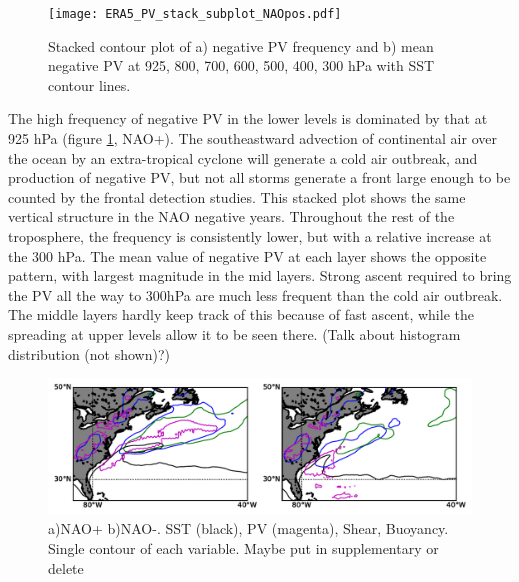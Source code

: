 \begin{figure}[h]
	\centering
	\texttt{[image: ERA5\_PV\_stack\_subplot\_NAOpos.pdf]}
	\caption{Stacked contour plot of a) negative PV frequency and b) mean negative PV at 925, 800, 700, 600, 500, 400, 300 hPa with SST contour lines.}
	\label{fig:ERA5_PV_stack}
\end{figure}


The high frequency of negative PV in the lower levels is dominated by that at 925 hPa (figure \ref{fig:ERA5_PV_stack}, NAO+). The southeastward advection of continental air over the ocean by an extra-tropical cyclone will generate a cold air outbreak, and production of negative PV, but not all storms generate a front large enough to be counted by the frontal detection studies. This stacked plot shows the same vertical structure in the NAO negative years. Throughout the rest of the troposphere, the frequency is consistently lower, but with a relative increase at the 300 hPa. The mean value of negative PV at each layer shows the opposite pattern, with largest magnitude in the mid layers. Strong ascent required to bring the PV all the way to 300hPa are much less frequent than the cold air outbreak. The middle layers hardly keep track of this because of fast ascent, while the spreading at upper levels allow it to be seen there. (Talk about histogram distribution (not shown)?)


\begin{figure}[h]
	\centering
	\includegraphics[width=30pc]{Sub_overlay_GS.pdf}
	\caption{a)NAO+ b)NAO-. SST (black), PV (magenta), Shear, Buoyancy. Single contour of each variable. Maybe put in supplementary or delete}
	\label{fig:ERA5_overlay}
\end{figure}


